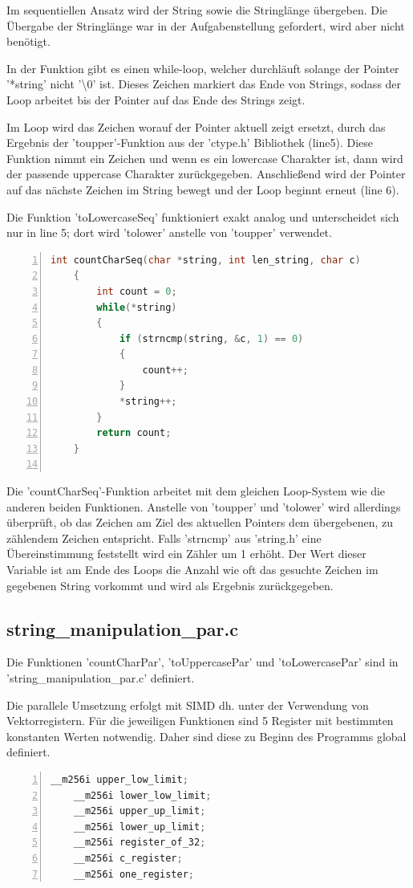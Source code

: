 \documentclass[plainarticle,zihtitle,german,final,hyperref,utf8]{zihpub}
\begin{document}
Im sequentiellen Ansatz wird der String sowie die Stringlänge übergeben. Die Übergabe der Stringlänge war in der Aufgabenstellung gefordert, wird aber nicht benötigt.

In der Funktion gibt es einen while-loop, welcher durchläuft solange der Pointer 
 '{*}string' nicht '\textbackslash0' ist. Dieses Zeichen markiert das Ende von Strings, sodass der Loop arbeitet bis der Pointer auf das Ende des Strings zeigt.

Im Loop wird das Zeichen worauf der Pointer aktuell zeigt ersetzt, durch das Ergebnis der 'toupper'-Funktion aus der 'ctype.h' Bibliothek (line5). Diese Funktion nimmt ein Zeichen und wenn es ein lowercase Charakter ist, dann wird der passende uppercase Charakter zurückgegeben. Anschließend wird der Pointer auf das nächste Zeichen im String bewegt und der Loop beginnt erneut (line 6).

Die Funktion 'toLowercaseSeq' funktioniert exakt analog und unterscheidet sich nur in line 5; dort wird 'tolower' anstelle von 'toupper' verwendet.

\begin{lstlisting}[language=c, numbers=left]
	int countCharSeq(char *string, int len_string, char c)
	{
		int count = 0;
		while(*string)
		{
			if (strncmp(string, &c, 1) == 0)
			{
				count++;
			}
			*string++;
		}
		return count;
	}
	
\end{lstlisting}

Die 'countCharSeq'-Funktion arbeitet mit dem gleichen Loop-System wie die anderen beiden Funktionen. Anstelle von 'toupper' und 'tolower' wird allerdings überprüft, ob das Zeichen am Ziel des aktuellen Pointers dem übergebenen, zu zählendem Zeichen entspricht. Falls 'strncmp' aus 'string.h' eine Übereinstimmung feststellt wird ein Zähler um 1 erhöht. Der Wert dieser Variable ist am Ende des Loops die Anzahl wie oft das gesuchte Zeichen im gegebenen String vorkommt und wird als Ergebnis zurückgegeben.


\subsection{string\_manipulation\_par.c}\label{subsec:par}
Die Funktionen 'countCharPar', 'toUppercasePar' und 'toLowercasePar' sind in 'string\_manipulation\_par.c' definiert.

Die parallele Umsetzung erfolgt mit SIMD dh. unter der Verwendung von Vektorregistern. Für die jeweiligen Funktionen sind 5 Register mit bestimmten konstanten Werten notwendig. Daher sind diese zu Beginn des Programms global definiert.
\begin{lstlisting}[language=c, numbers=left]
	__m256i upper_low_limit;
	__m256i lower_low_limit;
	__m256i upper_up_limit;
	__m256i lower_up_limit;
	__m256i register_of_32;
	__m256i c_register;
	__m256i one_register;
\end{lstlisting}
\end{document}

